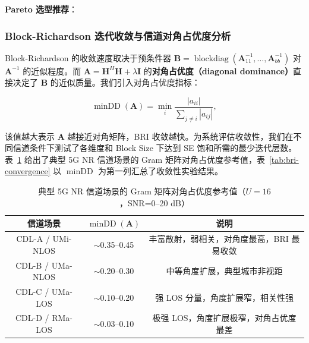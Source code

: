 \documentclass{CjC}
\begin{document}
    \textbf{Pareto 选型推荐}：

    \subsubsection{Block-Richardson 迭代收敛与信道对角占优度分析}

    Block-Richardson 的收敛速度取决于预条件器 $\bm{B}=\operatorname{blockdiag}(\bm
    {A}_{11}^{-1},\dots,\bm{A}_{bb}^{-1})$ 对 $\bm{A}^{-1}$ 的近似程度。而 $\bm{A}
    =\bm{H}^{H}\bm{H}+\lambda\bm{I}$ 的\textbf{对角占优度（diagonal dominance）}直接决定了
    $\bm{B}$ 的近似质量。我们引入对角占优度指标：

    \begin{equation}
        \operatorname{minDD}(\bm{A}) = \min_{i}\frac{|a_{ii}|}{\sum_{j\neq i}|a_{ij}|}
        ,
    \end{equation}

    该值越大表示 $\bm{A}$ 越接近对角矩阵，BRI
    收敛越快。为系统评估收敛性，我们在不同信道条件下测试了各维度和 Block
    Size 下达到 SE 饱和所需的最少迭代层数。表~\ref{tab:channel-minDD-reference} 给出了典型 5G NR 信道场景的 Gram 矩阵对角占优度参考值，表~\ref{tab:bri-convergence} 以 $\operatorname{minDD}$ 为第一列汇总了收敛性实验结果。

    \begin{table}[H]
        \centering
        \caption{典型 5G NR 信道场景的 Gram 矩阵对角占优度参考值（$U=16$，SNR=0--20 dB）}
        \label{tab:channel-minDD-reference}
        \begin{tabular}{c c c}
        \toprule
        \textbf{信道场景} & $\operatorname{minDD}(\bm{A})$ & \textbf{说明} \\
        \midrule
        CDL-A / UMi-NLOS  & $\sim$0.35--0.45 & 丰富散射，弱相关，对角度最高，BRI 最易收敛 \\
        CDL-B / UMa-NLOS  & $\sim$0.20--0.30 & 中等角度扩展，典型城市非视距 \\
        CDL-C / UMa-LOS   & $\sim$0.10--0.20 & 强 LOS 分量，角度扩展窄，相关性强 \\
        CDL-D / RMa-LOS   & $\sim$0.03--0.10 & 极强 LOS，角度扩展极窄，对角占优度最差 \\
        \bottomrule
        \end{tabular}
    \end{table}
\end{document}

